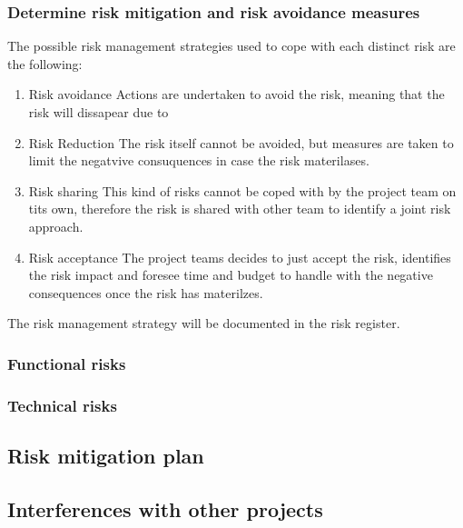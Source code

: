 \subsubsection{Determine risk mitigation and risk avoidance measures}
The possible risk management strategies used to cope with each distinct risk are the following:
\begin{enumerate}
	\item Risk avoidance
	Actions are undertaken to avoid the risk, meaning that the risk will dissapear due to 
	\item Risk Reduction
	The risk itself cannot be avoided, but measures are taken to limit the negatvive consuquences in case the risk materilases.
	\item Risk sharing
	This kind of risks cannot be coped with by the project team on tits own, therefore the risk is shared with other team to identify a joint risk approach.
	\item Risk acceptance
	The project teams decides to just accept the risk, identifies the risk impact and foresee time and budget to handle with the negative consequences once the risk has materilzes.
\end {enumerate}

The risk management strategy will be documented in the risk register.

\subsubsection{Functional risks}
\lipsum[1]
\subsubsection{Technical risks}
\lipsum[1]
\subsection{Risk mitigation plan}
\lipsum[1]

\subsection{Interferences with other projects}
\lipsum[1]